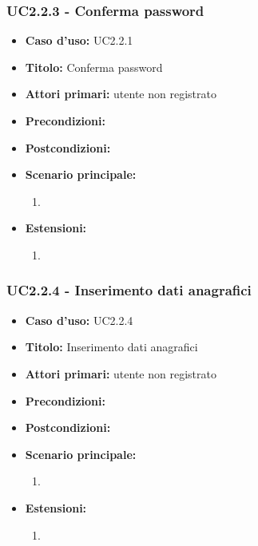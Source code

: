 \documentclass[casi-duso]{subfiles}
\begin{document}
\subsubsection{UC2.2.3 - Conferma password}
\label{subsub:uc2.2.3utente}
\begin{itemize}
  \item \textbf{Caso d’uso:} UC2.2.1 
  \item \textbf{Titolo:} Conferma password
  \item \textbf{Attori primari:} utente non registrato
  \item \textbf{Precondizioni:} 
  \item \textbf{Postcondizioni:}  
  \item \textbf{Scenario principale:} 
  \begin{enumerate}
    \item 
  \end{enumerate}
  \item \textbf{Estensioni:} 
  \begin{enumerate}
    \item 
  \end{enumerate}     
\end{itemize}

\subsubsection{UC2.2.4 - Inserimento dati anagrafici}
\label{subsub:uc2.2.4utente}
\begin{itemize}
  \item \textbf{Caso d’uso:} UC2.2.4 
  \item \textbf{Titolo:} Inserimento dati anagrafici
  \item \textbf{Attori primari:} utente non registrato
  \item \textbf{Precondizioni:} 
  \item \textbf{Postcondizioni:}  
  \item \textbf{Scenario principale:} 
  \begin{enumerate}
    \item 
  \end{enumerate}
  \item \textbf{Estensioni:} 
  \begin{enumerate}
    \item 
  \end{enumerate}     
\end{itemize}
\end{document}
